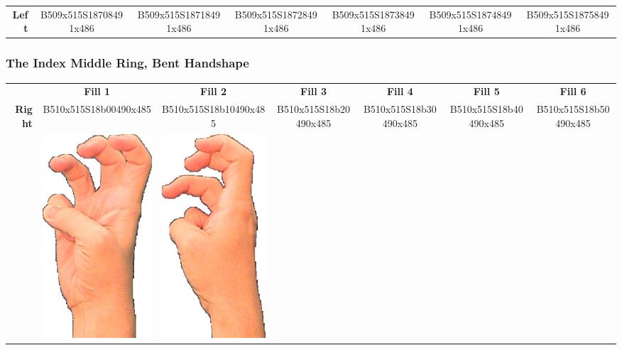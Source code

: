 \documentclass{article}
\begin{document}
\begin{center}
\begin{tabular}{r*{6}{c}}
\textbf{Left}&
B509x515S18708491x486&
B509x515S18718491x486&
B509x515S18728491x486&
B509x515S18738491x486&
B509x515S18748491x486&
B509x515S18758491x486\\
\end{tabular}
\end{center}

\subsubsection{The Index Middle Ring, Bent Handshape}

\begin{center}
\begin{tabular}{r*{6}{c}}
&\textbf{Fill 1}&\textbf{Fill 2}&\textbf{Fill 3}&\textbf{Fill 4}&\textbf{Fill 5}&\textbf{Fill 6}\\
\multirow{2}{*}{\textbf{Right}}&
B510x515S18b00490x485&
B510x515S18b10490x485&
B510x515S18b20490x485&
B510x515S18b30490x485&
B510x515S18b40490x485&
B510x515S18b50490x485\\
&
\includegraphics[scale=0.1]{images/06-03-1.jpg}&
\includegraphics[scale=0.1]{images/06-03-2.jpg}&

\end{tabular}
\end{center}
\end{document}
